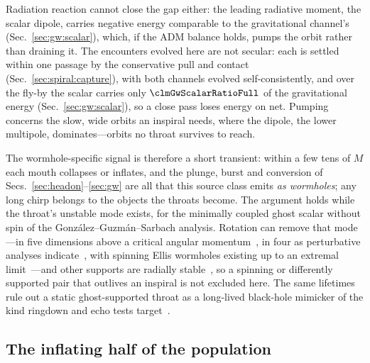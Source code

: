 \documentclass[twocolumn,floatfix,aps,prd,superscriptaddress,nofootinbib]{revtex4-2}
\begin{document}
Radiation reaction cannot close the gap either: the leading radiative moment, the scalar dipole, carries negative energy comparable to the gravitational channel's (Sec.~\ref{sec:gw:scalar}), which, if the ADM balance holds, pumps the orbit rather than draining it. The encounters evolved here are not secular: each is settled within one passage by the conservative pull and contact (Sec.~\ref{sec:spiral:capture}), with both channels evolved self-consistently, and over the fly-by the scalar carries only $\clmGwScalarRatioFull$ of the gravitational energy (Sec.~\ref{sec:gw:scalar}), so a close pass loses energy on net. Pumping concerns the slow, wide orbits an inspiral needs, where the dipole, the lower multipole, dominates---orbits no throat survives to reach.

The wormhole-specific signal is therefore a short transient: within a few tens of $M$ each mouth collapses or inflates, and the plunge, burst and conversion of Secs.~\ref{sec:headon}--\ref{sec:gw} are all that this source class emits \emph{as wormholes}; any long chirp belongs to the objects the throats become. The argument holds while the throat's unstable mode exists, for the minimally coupled ghost scalar without spin of the Gonz\'alez--Guzm\'an--Sarbach analysis. Rotation can remove that mode---in five dimensions above a critical angular momentum~\cite{dzhunushaliev2013}, in four as perturbative analyses indicate~\cite{azad2024plb,azad2024prd,khoo2024}, with spinning Ellis wormholes existing up to an extremal limit~\cite{kleihaus_kunz2014}---and other supports are radially stable~\cite{poisson_visser1995,kanti2011}, so a spinning or differently supported pair that outlives an inspiral is not excluded here. The same lifetimes rule out a static ghost-supported throat as a long-lived black-hole mimicker of the kind ringdown and echo tests target~\cite{cardoso2016,bueno2018}.

\subsection{The inflating half of the population}
\label{sec:discussion:inflating}
\end{document}
